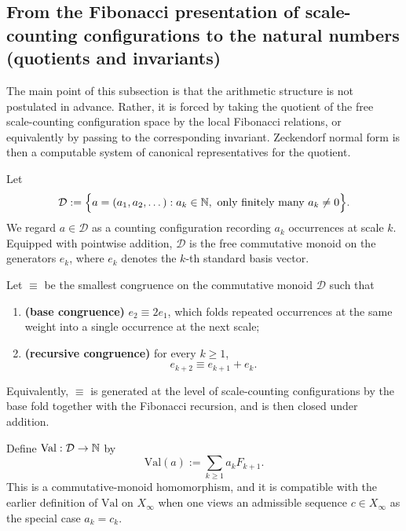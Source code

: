 \subsection{From the Fibonacci presentation of scale-counting configurations to the natural numbers (quotients and invariants)}\label{subsec:emergent-arithmetic-fib-congruence}

The main point of this subsection is that the arithmetic structure is not postulated in advance. Rather, it is forced by taking the quotient of the free scale-counting configuration space by the local Fibonacci relations, or equivalently by passing to the corresponding invariant. Zeckendorf normal form is then a computable system of canonical representatives for the quotient.

Let
\[
\mathcal{D}:=\Bigl\{a=(a_1,a_2,\dots): a_k\in\mathbb{N},\ \text{only finitely many }a_k\neq 0\Bigr\}.
\]
We regard \(a\in\mathcal{D}\) as a counting configuration recording \(a_k\) occurrences at scale \(k\). Equipped with pointwise addition, \(\mathcal{D}\) is the free commutative monoid on the generators \(e_k\), where \(e_k\) denotes the \(k\)-th standard basis vector.

\begin{definition}\label{def:fib-congruence}
Let \(\equiv\) be the smallest congruence on the commutative monoid \(\mathcal{D}\) such that
\begin{enumerate}
  \item \textbf{(base congruence)} \(e_2\equiv 2e_1\), which folds repeated occurrences at the same weight into a single occurrence at the next scale;
  \item \textbf{(recursive congruence)} for every \(k\ge 1\),
\[
e_{k+2}\equiv e_{k+1}+e_k.
\]
\end{enumerate}
Equivalently, \(\equiv\) is generated at the level of scale-counting configurations by the base fold together with the Fibonacci recursion, and is then closed under addition.
\end{definition}

\begin{definition}\label{def:val-on-D}
Define \(\mathrm{Val}:\mathcal{D}\to\mathbb{N}\) by
\[
\mathrm{Val}(a):=\sum_{k\ge 1} a_k F_{k+1}.
\]
This is a commutative-monoid homomorphism, and it is compatible with the earlier definition of \(\mathrm{Val}\) on \(X_\infty\) when one views an admissible sequence \(c\in X_\infty\) as the special case \(a_k=c_k\).
\end{definition}

